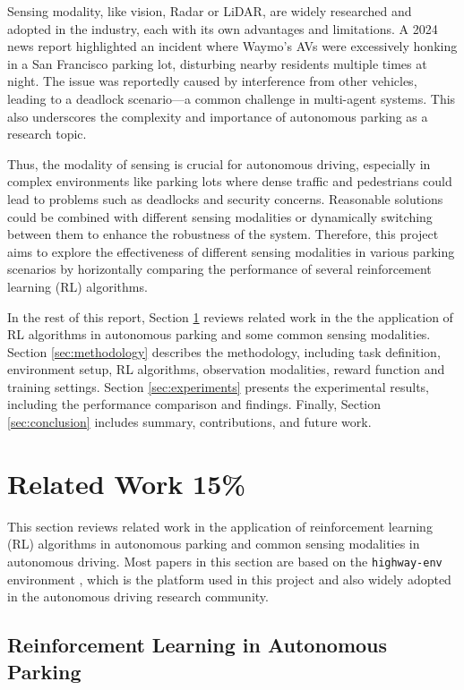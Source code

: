 \documentclass{article}
\begin{document}
Sensing modality, like vision, Radar or LiDAR, are widely researched and adopted in the industry, each with its own advantages and limitations. A 2024 news report \cite{news2024} highlighted an incident where Waymo’s AVs were excessively honking in a San Francisco parking lot, disturbing nearby residents multiple times at night. The issue was reportedly caused by interference from other vehicles, leading to a deadlock scenario—a common challenge in multi-agent systems. This also underscores the complexity and importance of autonomous parking as a research topic.

Thus, the modality of sensing is crucial for autonomous driving, especially in complex environments like parking lots where dense traffic and pedestrians could lead to problems such as deadlocks and security concerns. Reasonable solutions could be combined with different sensing modalities or dynamically switching between them to enhance the robustness of the system. Therefore, this project aims to explore the effectiveness of different sensing modalities in various parking scenarios by horizontally comparing the performance of several reinforcement learning (RL) algorithms.

In the rest of this report, Section \ref{sec:related_work} reviews related work in the the application of RL algorithms in autonomous parking and some common sensing modalities. Section \ref{sec:methodology} describes the methodology, including task definition, environment setup, RL algorithms, observation modalities, reward function and training settings. Section \ref{sec:experiments} presents the experimental results, including the performance comparison and findings. Finally, Section \ref{sec:conclusion} includes summary, contributions, and future work.

\section{Related Work 15\%}\label{sec:related_work}

This section reviews related work in the application of reinforcement learning (RL) algorithms in autonomous parking and common sensing modalities in autonomous driving. Most papers in this section are based on the \texttt{highway-env} environment \cite{highway-env}, which is the platform used in this project and also widely adopted in the autonomous driving research community.

\subsection{Reinforcement Learning in Autonomous Parking}
\end{document}
